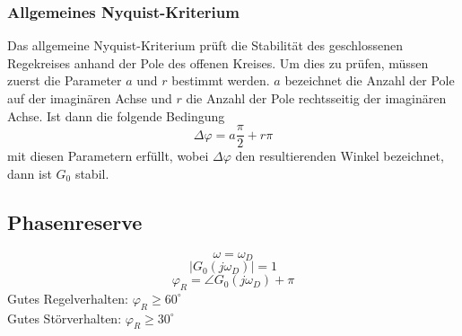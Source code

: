 \subsubsection{Allgemeines Nyquist-Kriterium}
Das allgemeine Nyquist-Kriterium prüft die Stabilität des geschlossenen
Regekreises anhand der Pole des offenen Kreises. 
%
%
Um dies zu prüfen, müssen zuerst die 
Parameter $a$ und $r$ bestimmt werden. $a$ bezeichnet die Anzahl der Pole
auf der imaginären Achse und $r$ die Anzahl der Pole rechtsseitig der
imaginären Achse. Ist dann die folgende Bedingung 
\[  
    \Delta \varphi = a \frac{\pi}{2} + r \pi
\]
mit diesen Parametern erfüllt, wobei $\Delta \varphi$ den resultierenden 
Winkel bezeichnet, dann ist $G_0$ stabil.

\subsection{Phasenreserve}
\begin{figure}[h!]
    \centering
\end{figure}
\[
    \omega = \omega_D
\]
\[
    |G_0(j \omega_D)| = 1
\]
\[
    \varphi_R = \angle G_0(j \omega_D) + \pi
\]
Gutes Regelverhalten: $\varphi_R \geq 60^\circ$ \\
Gutes Störverhalten:  $\varphi_R \geq 30^\circ$


